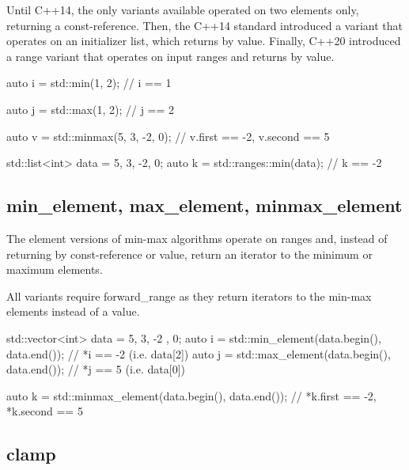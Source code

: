 Until C++14, the only variants available operated on two elements only, returning a const-reference. Then, the C++14 standard introduced a variant that operates on an initializer list, which returns by value. Finally, C++20 introduced a range variant that operates on input ranges and returns by value.

\begin{box-note}
\begin{cppcode}
auto i = std::min(1, 2);
// i == 1

auto j = std::max(1, 2);
// j == 2

auto v = std::minmax({5, 3, -2, 0});
// v.first == -2, v.second == 5

std::list<int> data = {5, 3, -2, 0};
auto k = std::ranges::min(data);
// k == -2
\end{cppcode}
\end{box-note}

\subsection{min\_element, max\_element, minmax\_element}

The element versions of min-max algorithms operate on ranges and, instead of returning by const-reference or value, return an iterator to the minimum or maximum elements.



All variants require forward\_range as they return iterators to the min-max elements instead of a value.

\begin{box-note}
\begin{cppcode}
std::vector<int> data = { 5, 3, -2 , 0};
auto i = std::min_element(data.begin(), data.end());
// *i == -2 (i.e. data[2])
auto j = std::max_element(data.begin(), data.end());
// *j == 5 (i.e. data[0])

auto k = std::minmax_element(data.begin(), data.end());
// *k.first == -2, *k.second == 5
\end{cppcode}
\end{box-note}

\subsection{clamp}


